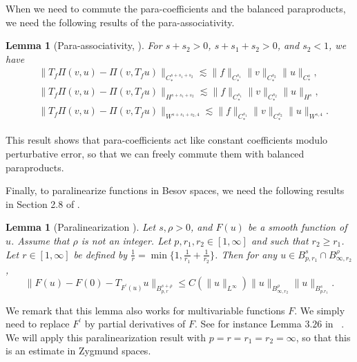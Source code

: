 \documentclass[10pt]{amsart}
\newtheorem{lemma}[theorem]{Lemma}
\theoremstyle{remark}
\theoremstyle{definition}
\numberwithin{equation}{section}
\begin{document}
When we need to commute the para-coefficients and the balanced paraproducts, we need the following results of the para-associativity.
\begin{lemma}[Para-associativity, \cite{AIT}] \label{t:Paraassociavity} 
 For $s+s_2 > 0$, $s+s_1+s_2>0$, and $s_2<1$, we have
\begin{align*}
&\| T_f\Pi(v,u)-\Pi(v, T_fu)\|_{ C_{*}^{s+s_1+s_2}} \lesssim \|f\|_{C^{s_1}_{*}}\|v\|_{C^{s_2}_{*}}\|u\|_{C^{s}_{*}}, \\
&\| T_f\Pi(v,u)-\Pi(v, T_fu)\|_{ H^{s+s_1+s_2}} \lesssim \|f\|_{C^{s_1}_{*}}\|v\|_{C^{s_2}_{*}}\|u\|_{H^s}, \\
&\| T_f\Pi(v,u)-\Pi(v, T_fu)\|_{ W^{s+s_1+s_2,4}} \lesssim \|f\|_{C^{s_1}_{*}}\|v\|_{C^{s_2}_{*}}\|u\|_{W^{s,4}}.
\end{align*}
\end{lemma}
This result shows that para-coefficients act like constant coefficients modulo perturbative error, so that we can freely commute them with balanced paraproducts.

Finally, to paralinearize functions in Besov spaces, we need the following results in Section 2.8 of \cite{MR2768550}.
\begin{lemma}[Paralinearization \cite{MR2768550}] \label{t:Paralinear}
Let $s, \rho>0$, and $F(u)$ be a smooth function of $u$.
Assume that $\rho$ is not an integer.
Let $p, r_1, r_2 \in [1, \infty]$ and such that $r_2 \geq r_1$.
Let $r \in [1,\infty]$ be defined by $\frac{1}{r} = \min \{1, \frac{1}{r_1}+\frac{1}{r_2} \}$.
Then for any $u\in B^s_{p, r_1}\cap B^\rho_{\infty, r_2}$,
\begin{equation*}
    \|F(u)-F(0)-T_{F^{'}(u)}u\|_{B^{s+\rho}_{p,r}} \leq C(\|u\|_{L^\infty})\|u\|_{B^\rho_{\infty, r_2}}\|u\|_{B^s_{p. r_1}}.
\end{equation*}
\end{lemma}
We remark that this lemma also works for multivariable functions $F$. 
We simply need to replace $F^{'}$ by partial derivatives of $F$.
See for instance Lemma $3.26$ in ~\cite{MR2805065}.
We will apply this paralinearization result with $p=r=r_1 =r_2 = \infty$, so that this is an estimate in Zygmund spaces.
\end{document}
